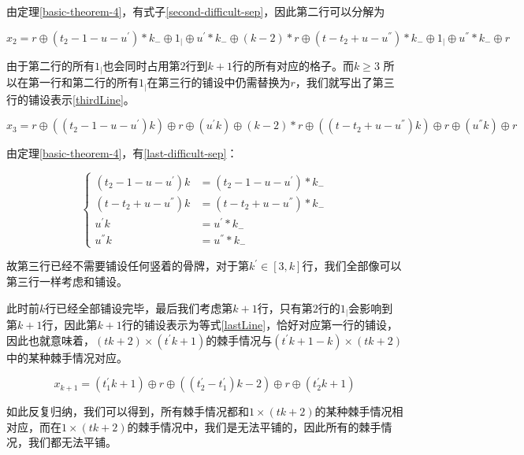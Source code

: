 由定理\ref*{basic-theorem-4}，有式子\ref*{second-difficult-sep}，因此第二行可以分解为

$x_2 =  r \oplus  (t_2- 1 - u - u^{'}) * k_{-} \oplus 1_{\vert} \oplus  u^{'} * k_{-}  \oplus (k - 2) * r \oplus (t - t_2 + u - u^{''}) * k_{-} \oplus 1_{\vert} \oplus  u^{''} * k_{-} \oplus r$

由于第二行的所有$1_{\vert}$也会同时占用第$2$行到$k + 1$行的所有对应的格子。而$k \ge 3$ 所以在第一行和第二行的所有$1_{\vert}$在第三行的铺设中仍需替换为$r$，我们就写出了第三行的铺设表示\ref{thirdLine}。

\begin{equation}
    x_3 =  r \oplus  ((t_2- 1 - u - u^{'})k) \oplus r \oplus  (u^{'}k) \oplus (k - 2) * r \oplus 
    ((t - t_2 + u - u^{''})k) \oplus r \oplus  (u^{''}k) \oplus r
    \label{thirdLine}
\end{equation}

由定理\ref*{basic-theorem-4}，有\ref*{last-difficult-sep}：

$$
    \left\{
    \begin{aligned}
        (t_2 - 1 - u - u^{'})k  & = (t_2- 1 - u - u^{'}) * k_{-}   \\
        (t - t_2 + u - u^{''})k & = (t - t_2 + u - u^{''}) * k_{-} \\
        u^{'}k                  & = u^{'} * k_{-}                  \\
        u^{''}k                 & = u^{''} * k_{-}
        \label{last-difficult-sep}
    \end{aligned}
    \right.
$$

故第三行已经不需要铺设任何竖着的骨牌，对于第$k^{'}\in [3, k]$行，我们全部像可以第三行一样考虑和铺设。

此时前$k$行已经全部铺设完毕，最后我们考虑第$k + 1$行，只有第$2$行的$1_{\vert}$会影响到第$k+1$行，因此第$k+1$行的铺设表示为等式\ref{lastLine}，恰好对应第一行的铺设，因此也就意味着，$(tk + 2) \times (t^{'}k + 1)$的棘手情况与$(t^{'}k + 1 - k) \times (tk + 2)$中的某种棘手情况对应。

\begin{equation}
    x_{k+1} =  (t^{'}_1k + 1) \oplus r \oplus  ((t^{'}_2 - t^{'}_1)k - 2) \oplus r \oplus  (t^{'}_2k + 1)
    \label{lastLine}
\end{equation}

如此反复归纳，我们可以得到，所有棘手情况都和$1 \times (tk + 2)$的某种棘手情况相对应，而在$1 \times (tk + 2)$的棘手情况中，我们是无法平铺的，因此所有的棘手情况，我们都无法平铺。

\clearpage